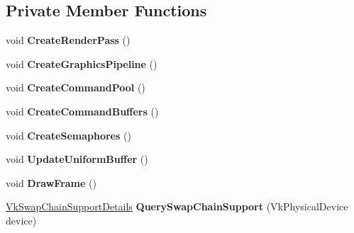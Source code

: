 \subsection*{Private Member Functions}
\begin{DoxyCompactItemize}
\item 
\mbox{\label{class_flounder_1_1_renderer_a774f2456a34765b2ed09bc22e001be80}} 
void {\bfseries Create\+Render\+Pass} ()
\item 
\mbox{\label{class_flounder_1_1_renderer_a12ba61a3a4e484af4dcd4cf54ec483b0}} 
void {\bfseries Create\+Graphics\+Pipeline} ()
\item 
\mbox{\label{class_flounder_1_1_renderer_ad337292b9e22f6d71c71e9ee659e9678}} 
void {\bfseries Create\+Command\+Pool} ()
\item 
\mbox{\label{class_flounder_1_1_renderer_aaffe2d2ccc216b8871c869b92a2f156f}} 
void {\bfseries Create\+Command\+Buffers} ()
\item 
\mbox{\label{class_flounder_1_1_renderer_ac62e29e58858c3420ef505f4ef95e25d}} 
void {\bfseries Create\+Semaphores} ()
\item 
\mbox{\label{class_flounder_1_1_renderer_afe466633c788d9b3ac0357184ab06ad1}} 
void {\bfseries Update\+Uniform\+Buffer} ()
\item 
\mbox{\label{class_flounder_1_1_renderer_a58a024f7ac6185f22afc8e81de993658}} 
void {\bfseries Draw\+Frame} ()
\item 
\mbox{\label{class_flounder_1_1_renderer_a82bfc11127a874784c1b1e3774e661bc}} 
\hyperlink{struct_flounder_1_1_vk_swap_chain_support_details}{Vk\+Swap\+Chain\+Support\+Details} {\bfseries Query\+Swap\+Chain\+Support} (Vk\+Physical\+Device device)
\end{DoxyCompactItemize}
